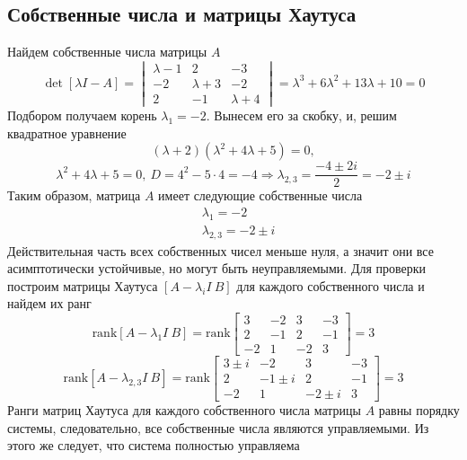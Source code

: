 \documentclass[a4paper, 12pt]{article}
\begin{document}
    \subsection{Собственные числа и матрицы Хаутуса}
    Найдем собственные числа матрицы $A$
    $$\det\left[\lambda I -A\right]=\begin{vmatrix}
        \lambda-1 &2 &-3\\
        -2 &\lambda+3 &-2\\
        2 &-1 &\lambda+4
    \end{vmatrix}=\lambda^3+6\lambda^2+13\lambda+10=0$$
    Подбором получаем корень $\lambda_1=-2$. Вынесем его за скобку, и, решим квадратное уравнение
    $$\left(\lambda+2\right)\left(\lambda^2+4\lambda+5\right)=0,$$
    $$\lambda^2+4\lambda+5=0,\ D=4^2-5\cdot4=-4\Rightarrow\lambda_{2,3}=\dfrac{-4\pm2i}{2}=-2\pm i$$
    Таким образом, матрица $A$ имеет следующие собственные числа
    \begin{align*}
        &\lambda_1=-2\\
        &\lambda_{2,3}=-2\pm i
    \end{align*}
    Действительная часть всех собственных чисел меньше нуля, а значит они все асимптотически устойчивые, но могут быть неуправляемыми.
    Для проверки построим матрицы Хаутуса $\left[A-\lambda_i I\ B\right]$ для каждого собственного числа и найдем их ранг
    $$\text{rank}\left[A-\lambda_1 I\ B\right]=\text{rank}\begin{bmatrix}
        3 &-2 &3 &-3\\
        2 &-1 &2 &-1\\
        -2 &1 &-2 &3
    \end{bmatrix}=3$$
    $$\text{rank}\left[A-\lambda_{2,3} I\ B\right]=\text{rank}\begin{bmatrix}
        3\pm i &-2 &3 &-3\\
        2 &-1\pm i &2 &-1\\
        -2 &1 &-2\pm i &3
    \end{bmatrix}=3$$
    Ранги матриц Хаутуса для каждого собственного числа матрицы $A$ равны порядку системы, следовательно, все
    собственные числа являются управляемыми. Из этого же следует, что система полностью управляема
\end{document}
